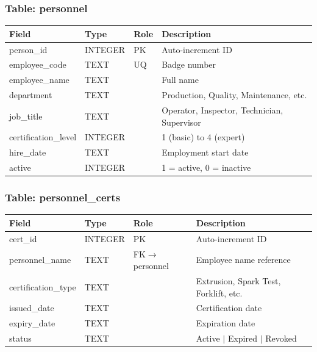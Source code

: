 \documentclass[11pt]{article}
\begin{document}
\subsubsection*{Table: personnel}
\begin{table}[H]\centering\small
\begin{tabular}{@{} l l l L{5.5cm} @{}}
\toprule
\textbf{Field} & \textbf{Type} & \textbf{Role} & \textbf{Description} \\
\midrule
person\_id          & INTEGER & PK  & Auto-increment ID \\
employee\_code      & TEXT    & UQ  & Badge number \\
employee\_name      & TEXT    &     & Full name \\
department          & TEXT    &     & Production, Quality, Maintenance, etc. \\
job\_title          & TEXT    &     & Operator, Inspector, Technician, Supervisor \\
certification\_level & INTEGER &    & 1 (basic) to 4 (expert) \\
hire\_date          & TEXT    &     & Employment start date \\
active              & INTEGER &     & 1 = active, 0 = inactive \\
\bottomrule
\end{tabular}
\end{table}

\subsubsection*{Table: personnel\_certs}
\begin{table}[H]\centering\small
\begin{tabular}{@{} l l l L{5.5cm} @{}}
\toprule
\textbf{Field} & \textbf{Type} & \textbf{Role} & \textbf{Description} \\
\midrule
cert\_id             & INTEGER & PK  & Auto-increment ID \\
personnel\_name      & TEXT    & FK$\to$personnel & Employee name reference \\
certification\_type  & TEXT    &     & Extrusion, Spark Test, Forklift, etc. \\
issued\_date         & TEXT    &     & Certification date \\
expiry\_date         & TEXT    &     & Expiration date \\
status               & TEXT    &     & Active $\mid$ Expired $\mid$ Revoked \\
\bottomrule
\end{tabular}
\end{table}
\end{document}
